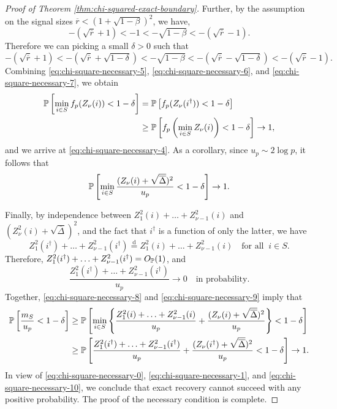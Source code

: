 \begin{proof}[Proof of Theorem \ref{thm:chi-squared-exact-boundary}]
Further, by the assumption on the signal sizes $\overline{r} < (1+\sqrt{1-\beta})^2$, we have,
\begin{equation*}
    -(\sqrt{\overline{r}}+1) < -1 <- \sqrt{1-\beta} < - (\sqrt{\overline{r}}-1).
\end{equation*}
Therefore we can picking a small $\delta>0$ such that 
\begin{equation} \label{eq:chi-square-necessary-7}
    -(\sqrt{\overline{r}}+1) < -(\sqrt{\overline{r}}+\sqrt{1-\delta})
    < - \sqrt{1-\beta}
    < - (\sqrt{\overline{r}}-\sqrt{1-\delta})
    < - (\sqrt{\overline{r}}-1).
\end{equation}
Combining \eqref{eq:chi-square-necessary-5}, \eqref{eq:chi-square-necessary-6}, and \eqref{eq:chi-square-necessary-7}, we obtain
\begin{align*}
    \P\left[\min_{i\in S} f_p(Z_\nu(i)) < 1-\delta\right]
    &= \P\left[ f_p(Z_\nu(i^\dagger)) < 1-\delta \right] \\
    &\ge \P\left[ f_p\left(\min_{i\in S}Z_\nu(i)\right) < 1-\delta \right] \to 1,
\end{align*}
and we arrive at \eqref{eq:chi-square-necessary-4}.
As a corollary, since $u_p\sim2\log{p}$, it follows that
\begin{equation} \label{eq:chi-square-necessary-8}
    \P\left[\min_{i\in S}\frac{(Z_\nu(i) + \sqrt{\overline{\Delta}})^2}{u_p} < 1-\delta\right]\to1.
\end{equation}

Finally, by independence between $Z_1^2(i)+\ldots+Z_{\nu-1}^2(i)$ and $(Z_\nu^2(i)+\sqrt{\overline{\Delta}})^2$, and the fact that $i^\dagger$ is a function of only the latter, we have
$$
Z_1^2(i^\dagger)+\ldots+Z_{\nu-1}^2(i^\dagger) 
\stackrel{\mathrm{d}}{=} Z_1^2(i)+\ldots+Z_{\nu-1}^2(i) 
\quad \text{for all} \;\; i\in S.
$$
Therefore, $Z_1^2(i^\dagger)+\ldots+Z_{\nu-1}^2(i^\dagger) = O_\P(1)$, and 
\begin{equation} \label{eq:chi-square-necessary-9}
    \frac{Z_1^2(i^\dagger)+\ldots+Z_{\nu-1}^2(i^\dagger)}{u_p} \to 0 \quad \text{in probability}. 
\end{equation}
Together, \eqref{eq:chi-square-necessary-8} and \eqref{eq:chi-square-necessary-9} imply that
\begin{align}
    \P\left[\frac{m_S}{u_p}<1-\delta\right]
    &\ge \P\left[\min_{i\in S}\left\{\frac{Z_1^2(i) + \ldots + Z_{\nu-1}^2(i)}{u_p} + \frac{(Z_\nu(i) + \sqrt{\overline{\Delta}})^2}{u_p}\right\} < 1-\delta\right] \nonumber \\
    &\ge \P\left[\frac{Z_1^2(i^\dagger) + \ldots + Z_{\nu-1}^2(i^\dagger)}{u_p} + \frac{(Z_\nu(i^\dagger) + \sqrt{\overline{\Delta}})^2}{u_p} < 1-\delta\right] \to 1. \label{eq:chi-square-necessary-10}
\end{align}
In view of \eqref{eq:chi-square-necessary-0}, \eqref{eq:chi-square-necessary-1}, and \eqref{eq:chi-square-necessary-10}, we conclude that exact recovery cannot succeed with any positive probability.
The proof of the necessary condition is complete.
\end{proof}

